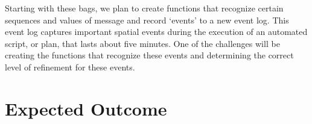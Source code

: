 \documentclass{article}
\begin{document}
Starting with these bags, we plan to create functions that recognize certain sequences and values of message and record `events' to a new event log.
This event log captures important spatial events during the execution of an automated script, or plan, that lasts about five minutes.
One of the challenges will be creating the functions that recognize these events and determining the correct level of refinement for these events.





\section{Expected Outcome} 




\end{document}
